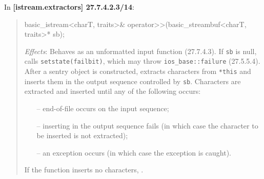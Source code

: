 \documentclass{wg21}
\begin{document}
In \textbf{[istream.extractors] 27.7.4.2.3/14}:
\begin{quote}
\begin{codeblock}
basic_istream<charT, traits>& operator>>(basic_streambuf<charT, traits>* sb);
\end{codeblock}
\textit{Effects}: Behaves as an unformatted input function (27.7.4.3). If \texttt{sb}
is null, calls \texttt{setstate(failbit)}, which may throw \texttt{ios_base::failure}
(27.5.5.4). After a sentry object is constructed, extracts characters from \texttt{*this}
and inserts them in the output sequence controlled by \texttt{sb}. Characters are
extracted and inserted until any of the following occurs:
\begin{itemize}
  \item[--] end-of-file occurs on the input sequence;
  \item[--] inserting in the output sequence fails (in which case the character to
            be inserted is not extracted);
  \item[--] an exception occurs (in which case the exception is caught).
\end{itemize}
If the function inserts no characters, .
\end{quote}
\end{document}
